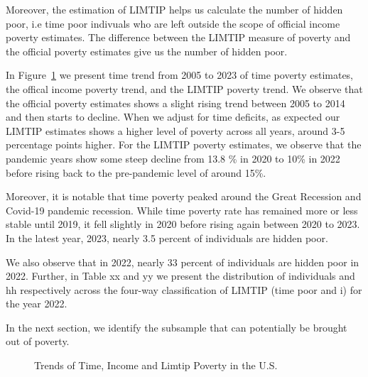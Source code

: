 \documentclass[
  11pt,
]{article}
\begin{document}
Moreover, the estimation of LIMTIP helps us calculate the number of
hidden poor, i.e time poor indivuals who are left outside the scope of
official income poverty estimates. The difference between the LIMTIP
measure of poverty and the official poverty estimates give us the number
of hidden poor.

In Figure~\ref{fig-trend} we present time trend from 2005 to 2023 of
time poverty estimates, the offical income poverty trend, and the LIMTIP
poverty trend. We observe that the official poverty estimates shows a
slight rising trend between 2005 to 2014 and then starts to decline.
When we adjust for time deficits, as expected our LIMTIP estimates shows
a higher level of poverty across all years, around 3-5 percentage points
higher. For the LIMTIP poverty estimates, we observe that the pandemic
years show some steep decline from 13.8 \% in 2020 to 10\% in 2022
before rising back to the pre-pandemic level of around 15\%.

Moreover, it is notable that time poverty peaked around the Great
Recession and Covid-19 pandemic recession. While time poverty rate has
remained more or less stable until 2019, it fell slightly in 2020 before
rising again between 2020 to 2023. In the latest year, 2023, nearly 3.5
percent of individuals are hidden poor.

We also observe that in 2022, nearly 33 percent of individuals are
hidden poor in 2022. Further, in Table xx and yy we present the
distribution of individuals and hh respectively across the four-way
classification of LIMTIP (time poor and i) for the year 2022.

In the next section, we identify the subsample that can potentially be
brought out of poverty.

\begin{figure}


\caption{\label{fig-trend}Trends of Time, Income and Limtip Poverty in
the U.S.}

\end{figure}%
\end{document}
